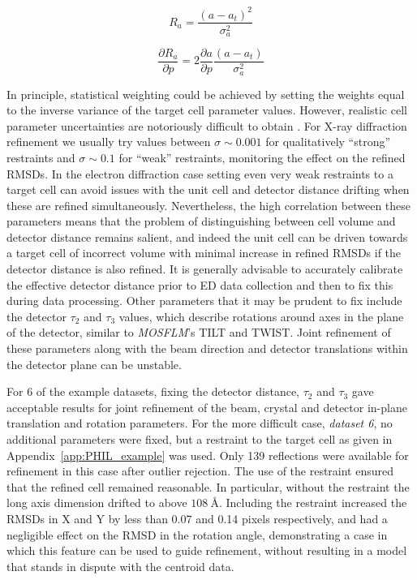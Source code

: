 \documentclass[preprint]{iucr}
\newcommand{\mosflm}{\emph{MOSFLM}\xspace}
\newcommand{\pder}[2][]{\frac{\partial#1}{\partial#2}}
\begin{document}
\begin{equation}
\label{eq:restraint_to_target}
R_a = \frac{\left( a - a_t \right)^2}{\sigma_a^2}
\end{equation}

\begin{equation}
\pder[R_a]{p} = 2 \pder[a]{p} \frac{\left( a - a_t \right)}{\sigma_a^2}
\end{equation}

In principle, statistical weighting could be achieved by
setting the weights equal to the inverse variance of the target cell parameter
values. However, realistic cell parameter uncertainties are notoriously
difficult to obtain \cite{Dauter2015}. For X-ray diffraction refinement we
usually try values between $\sigma \sim 0.001$ for qualitatively ``strong''
restraints and $\sigma \sim 0.1$ for ``weak'' restraints, monitoring the
effect on the refined RMSDs. In the electron diffraction case setting even very
weak restraints to a target cell can avoid issues with the unit cell and
detector distance drifting when these are refined simultaneously. Nevertheless,
the high correlation between these parameters means that the problem of
distinguishing between cell volume and detector distance remains salient, and
indeed the unit cell can be driven towards a target cell of incorrect volume
with minimal increase in refined RMSDs if the detector distance is also
refined. It is generally advisable to accurately calibrate the effective
detector distance prior to ED data collection and then to fix this during
data processing. Other parameters that it may be prudent to fix include the
detector $\tau_2$ and $\tau_3$ values, which describe rotations around axes in
the plane of the detector, similar to \mosflm's TILT and TWIST. Joint refinement
of these parameters along with the beam direction and detector translations
within the detector plane can be unstable.

For 6 of the example datasets, fixing the detector distance, $\tau_2$ and $\tau_3$
gave acceptable results for joint refinement of the beam, crystal and detector
in-plane translation and rotation parameters. For the more difficult case,
\emph{dataset 6}, no additional parameters were fixed, but a restraint to
the target cell as given in Appendix~\ref{app:PHIL_example} was used. Only 139
reflections were available for refinement in this case after outlier rejection.
The use of the restraint ensured that the refined cell remained reasonable. In
particular, without the restraint the long axis dimension drifted to above
$\SI{108}{\angstrom}$. Including the restraint increased the RMSDs in X and Y
by less than 0.07 and 0.14 pixels respectively, and had a negligible effect on
the RMSD in the rotation angle, demonstrating a case in which this feature can
be used to guide refinement, without resulting in a model that stands in dispute
with the centroid data.
\end{document}
